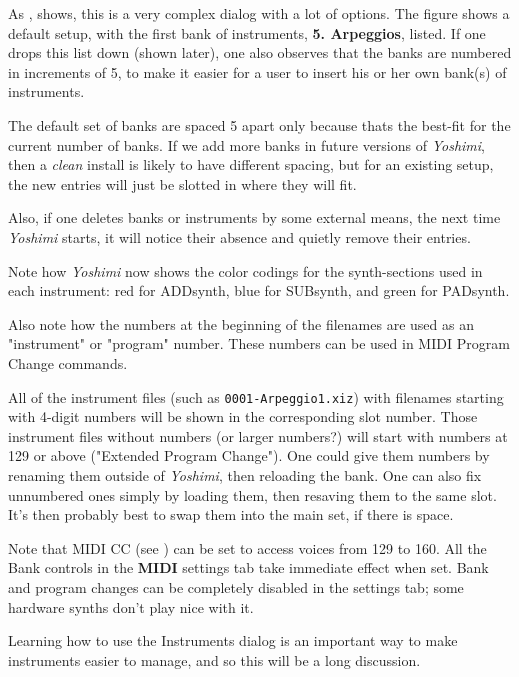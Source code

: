    As ,
   shows, this is a very complex dialog with a lot of options.
   The figure shows a default setup, with the first bank of instruments,
   \textbf{5. Arpeggios}, listed.
   If one drops this list down (shown later), one also observes that the banks
   are numbered in increments of 5, to make it easier for a user to insert his
   or her own bank(s) of instruments.

   The default set of banks are spaced 5 apart only because thats the
   best-fit for the current number of banks.  If we add more banks in future
   versions of \textsl{Yoshimi}, then a \textsl{clean} install is likely to have
   different spacing, but for an existing setup, the new entries will just be
   slotted in where they will fit.

   Also, if one deletes banks or instruments by some external means, the next
   time \textsl{Yoshimi} starts, it will notice their absence and quietly
   remove their entries.

   Note how \textsl{Yoshimi} now shows the color codings for the
   synth-sections used in each instrument:
   red for ADDsynth, blue for SUBsynth, and green for PADsynth.

   Also note how the numbers at the beginning of the filenames are used as
   an "instrument" or "program" number.  These numbers can be used in MIDI
   Program Change commands.
   
   All of the instrument files (such as \texttt{0001-Arpeggio1.xiz})
   with filenames starting with 4-digit numbers will be
   shown in the corresponding slot number.  Those instrument files
   without numbers (or larger numbers?) will start
   with numbers at 129 or above ("Extended Program Change").
   One could give them numbers by renaming them outside of \textsl{Yoshimi},
   then reloading the bank.
   One can also fix unnumbered ones simply by loading them, then resaving them
   to the same slot. It's then probably best to swap them into the main set,
   if there is space.

   Note that MIDI CC
   (see )
   can be set to access voices from 129 to 160.
   All the Bank controls in the \textbf{MIDI} settings tab take immediate
   effect when set.
   Bank and program changes can be completely disabled in the settings tab;
   some hardware synths don't play nice with it.

   Learning how to use the Instruments dialog is an important way to make
   instruments easier to manage, and so this will be a long discussion.

